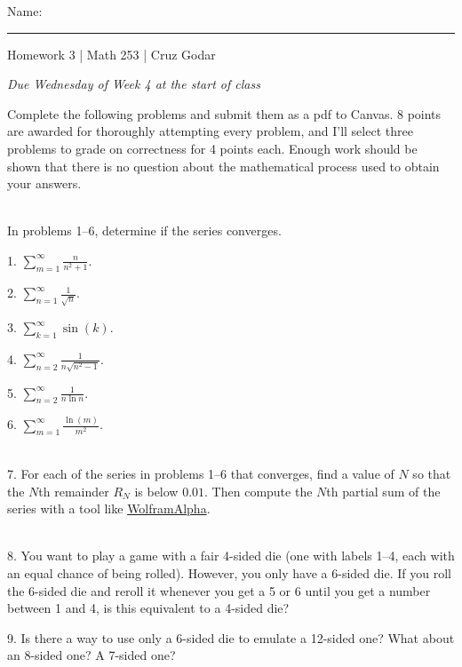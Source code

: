 \documentclass{article}
\begin{document}
\Large Name: \rule{2in}{0.15mm} \hfill Homework 3 | Math 253 | Cruz Godar \vspace{4pt} \normalsize

\textit{Due Wednesday of Week 4 at the start of class}

Complete the following problems and submit them as a pdf to Canvas. 8 points are awarded for thoroughly attempting every problem, and I'll select three problems to grade on correctness for 4 points each. Enough work should be shown that there is no question about the mathematical process used to obtain your answers.

~\\

In problems 1--6, determine if the series converges.

1. $\displaystyle \sum_{m = 1}^\infty \frac{n}{n^2 + 1}$.

2. $\displaystyle \sum_{n = 1}^\infty \frac{1}{\sqrt{n}}$.

3. $\displaystyle \sum_{k = 1}^\infty \sin(k)$.

4. $\displaystyle \sum_{n = 2}^\infty \frac{1}{n \sqrt{n^2 - 1}}$.

5. $\displaystyle \sum_{n = 2}^\infty \frac{1}{n\ln{n}}$.

6. $\displaystyle \sum_{m = 1}^\infty \frac{\ln(m)}{m^2}$.

~\\

7. For each of the series in problems 1--6 that converges, find a value of $N$ so that the $N$th remainder $R_N$ is below $0.01$. Then compute the $N$th partial sum of the series with a tool like \href{www.wolframalpha.com/}{WolframAlpha}.

~\\

8. You want to play a game with a fair 4-sided die (one with labels 1--4, each with an equal chance of being rolled). However, you only have a 6-sided die. If you roll the 6-sided die and reroll it whenever you get a 5 or 6 until you get a number between 1 and 4, is this equivalent to a 4-sided die?

9. Is there a way to use only a 6-sided die to emulate a 12-sided one? What about an 8-sided one? A 7-sided one?
\end{document}
